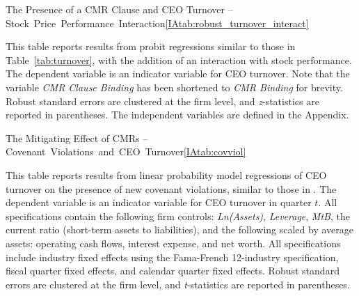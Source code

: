 \documentclass[12pt]{article}
\begin{document}
\begin{appendices}
\begin{singlespace}
\begin{papertable}{The Presence of a CMR Clause and CEO Turnover -- Stock~Price~Performance~Interaction}{\ref{IAtab:robust_turnover_interact}}{}
  \label{IAtab:robust_turnover_interact}

  This table reports results from probit regressions similar to those in Table~\ref{tab:turnover}, with the addition of an interaction with stock performance.
  The dependent variable is an indicator variable for CEO turnover.
  Note that the variable \textit{CMR Clause Binding} has been shortened to \textit{CMR Binding} for brevity.
  Robust standard errors are clustered at the firm level, and \textit{z}-statistics are reported in parentheses.
  The independent variables are defined in the Appendix.
  \postamblesig

  \startdata
  

\end{papertable}

\begin{papertable}{The Mitigating Effect of CMRs -- Covenant~Violations~and~CEO~Turnover}{\ref{IAtab:covviol}}{}
  \label{IAtab:covviol}

  This table reports results from linear probability model regressions of CEO turnover on the presence of new covenant violations, similar to those in \cite{Nini_2012}.
  The dependent variable is an indicator variable for CEO turnover in quarter $t$.
  All specifications contain the following firm controls: \textit{Ln(Assets)}, \textit{Leverage}, \textit{MtB}, the current ratio (short-term assets to liabilities), and the following scaled by average assets: operating cash flows, interest expense, and net worth.
  All specifications include industry fixed effects using the Fama-French 12-industry specification, fiscal quarter fixed effects, and calendar quarter fixed effects.
  Robust standard errors are clustered at the firm level, and \textit{t}-statistics are reported in parentheses.
  \postamblesig

  \startdata
  

\end{papertable}





\end{singlespace}
\end{appendices}
\end{document}
